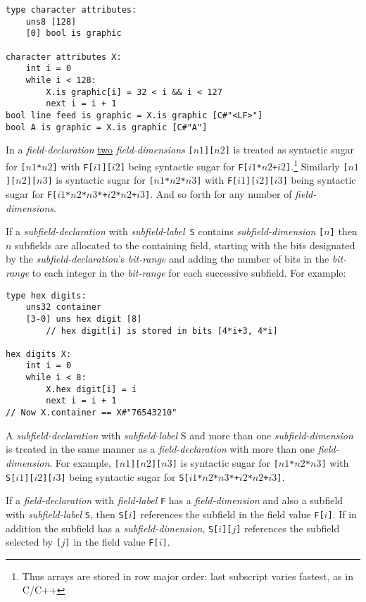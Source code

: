 \documentclass[12pt]{article}
\newcommand{\EOL}{\penalty \exhyphenpenalty}
\newenvironment{indpar}[1][0.3in]%
	{\begin{list}{}%
		     {\setlength{\itemsep}{0in}%
		      \setlength{\topsep}{0in}%
		      \setlength{\parsep}{1ex}%
		      \setlength{\labelwidth}{#1}%
		      \setlength{\leftmargin}{#1}%
		      \addtolength{\leftmargin}{\labelsep}}%
	 \item}%
	{\end{list}}
\begin{document}
\begin{indpar}\begin{verbatim}
type character attributes:
    uns8 [128]
    [0] bool is graphic

character attributes X:
    int i = 0
    while i < 128:
        X.is graphic[i] = 32 < i && i < 127
        next i = i + 1
bool line feed is graphic = X.is graphic [C#"<LF>"]
bool A is graphic = X.is graphic [C#"A"]
\end{verbatim}\end{indpar}

In a {\em field-declaration}
\underline{two} {\em field-dimensions} {\tt [$n1$][$n2$]} is
treated as syntactic sugar for {\tt [$n1$*$n2$]} with
{\tt F[$i1$][$i2$]} being syntactic sugar for
{\tt F[$i1$*$n2$+$i2$]}.\footnote{Thus arrays are stored in
row major order: last subscript varies fastest, as in C/C++}
Similarly
{\tt [$n1$][$n2$][$n3$]} is
syntactic sugar for {\tt [$n1$*$n2$*$n3$]} with
{\tt F[$i1$][$i2$][$i3$]} being syntactic sugar for
{\tt F[$i1$*$n2$*$n3$*+$i2$*$n2$+$i3$]}.  And so forth for any
number of {\em field-dimensions}.

If a {\em subfield-declaration} with {\em subfield-label}\, {\tt S} contains 
{\em subfield-dimension} {\tt [$n$]} then $n$ subfields are
allocated to the containing field, starting with the bits
designated by the {\em subfield-declaration}'s {\em bit-range}
and adding the number of bits in the {\em bit-range} to each integer
in the {\em bit-range} for each successive subfield.
For example:

\begin{indpar}\begin{verbatim}
type hex digits:
    uns32 container
    [3-0] uns hex digit [8]
        // hex digit[i] is stored in bits [4*i+3, 4*i]

hex digits X:
    int i = 0
    while i < 8:
        X.hex digit[i] = i
        next i = i + 1
// Now X.container == X#"76543210"
\end{verbatim}\end{indpar}

A {\em subfield-declaration} with {\em subfield-label} S
and more than one {\em subfield-dimension} is
treated in the same manner as a {\em field-declaration} with
more than one {\em field-dimension}.  For example,
{\tt [$n1$][$n2$][$n3$]} is
syntactic sugar for {\tt [$n1$*$n2$*$n3$]} with
{\tt S[$i1$][$i2$][$i3$]} being syntactic sugar for
{\tt S[$i1$*$n2$*$n3$*+\EOL $i2$*$n2$+\EOL $i3$]}.

If a {\em field-declaration} with {\em field-label} {\tt F}
has a {\em field-dimension}
and also a subfield with {\em subfield-label} {\tt S}, then
{\tt S[$i$]} references the subfield in the field value {\tt F[$i$]}.
If in addition the subfield has a {\em subfield-dimension},
{\tt S[$i$][$j$]} references the subfield selected by {\tt [$j$]}
in the field value {\tt F[$i$]}.
\end{document}
